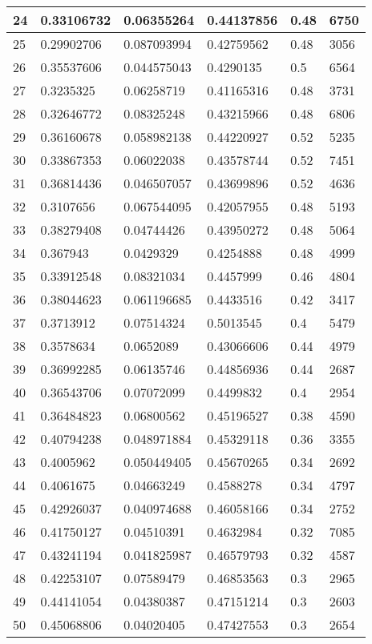 \begin{longtable}{|l|l|l|l|l|l|}
24 & 0.33106732 & 0.06355264 & 0.44137856 & 0.48 & 6750 \\ \hline 
25 & 0.29902706 & 0.087093994 & 0.42759562 & 0.48 & 3056 \\ \hline 
26 & 0.35537606 & 0.044575043 & 0.4290135 & 0.5 & 6564 \\ \hline 
27 & 0.3235325 & 0.06258719 & 0.41165316 & 0.48 & 3731 \\ \hline 
28 & 0.32646772 & 0.08325248 & 0.43215966 & 0.48 & 6806 \\ \hline 
29 & 0.36160678 & 0.058982138 & 0.44220927 & 0.52 & 5235 \\ \hline 
30 & 0.33867353 & 0.06022038 & 0.43578744 & 0.52 & 7451 \\ \hline 
31 & 0.36814436 & 0.046507057 & 0.43699896 & 0.52 & 4636 \\ \hline 
32 & 0.3107656 & 0.067544095 & 0.42057955 & 0.48 & 5193 \\ \hline 
33 & 0.38279408 & 0.04744426 & 0.43950272 & 0.48 & 5064 \\ \hline 
34 & 0.367943 & 0.0429329 & 0.4254888 & 0.48 & 4999 \\ \hline 
35 & 0.33912548 & 0.08321034 & 0.4457999 & 0.46 & 4804 \\ \hline 
36 & 0.38044623 & 0.061196685 & 0.4433516 & 0.42 & 3417 \\ \hline 
37 & 0.3713912 & 0.07514324 & 0.5013545 & 0.4 & 5479 \\ \hline 
38 & 0.3578634 & 0.0652089 & 0.43066606 & 0.44 & 4979 \\ \hline 
39 & 0.36992285 & 0.06135746 & 0.44856936 & 0.44 & 2687 \\ \hline 
40 & 0.36543706 & 0.07072099 & 0.4499832 & 0.4 & 2954 \\ \hline 
41 & 0.36484823 & 0.06800562 & 0.45196527 & 0.38 & 4590 \\ \hline 
42 & 0.40794238 & 0.048971884 & 0.45329118 & 0.36 & 3355 \\ \hline 
43 & 0.4005962 & 0.050449405 & 0.45670265 & 0.34 & 2692 \\ \hline 
44 & 0.4061675 & 0.04663249 & 0.4588278 & 0.34 & 4797 \\ \hline 
45 & 0.42926037 & 0.040974688 & 0.46058166 & 0.34 & 2752 \\ \hline 
46 & 0.41750127 & 0.04510391 & 0.4632984 & 0.32 & 7085 \\ \hline 
47 & 0.43241194 & 0.041825987 & 0.46579793 & 0.32 & 4587 \\ \hline 
48 & 0.42253107 & 0.07589479 & 0.46853563 & 0.3 & 2965 \\ \hline 
49 & 0.44141054 & 0.04380387 & 0.47151214 & 0.3 & 2603 \\ \hline 
50 & 0.45068806 & 0.04020405 & 0.47427553 & 0.3 & 2654 \\ \hline 
\end{longtable}
